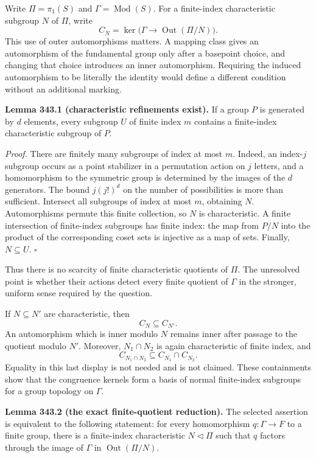 \documentclass[11pt]{article}
\begin{document}
Write $\Pi=\pi_1(S)$ and $\Gamma=\operatorname{Mod}(S)$. For a finite-index characteristic subgroup $N$ of $\Pi$, write
\[
 C_N=\ker\bigl(\Gamma\longrightarrow\operatorname{Out}(\Pi/N)\bigr).
\]
This use of outer automorphisms matters. A mapping class gives an automorphism of the fundamental group only after a basepoint choice, and changing that choice introduces an inner automorphism. Requiring the induced automorphism to be literally the identity would define a different condition without an additional marking.

\textbf{Lemma 343.1 (characteristic refinements exist).} If a group $P$ is generated by $d$ elements, every subgroup $U$ of finite index $m$ contains a finite-index characteristic subgroup of $P$.

\emph{Proof.} There are finitely many subgroups of index at most $m$. Indeed, an index-$j$ subgroup occurs as a point stabilizer in a permutation action on $j$ letters, and a homomorphism to the symmetric group is determined by the images of the $d$ generators. The bound $j(j!)^d$ on the number of possibilities is more than sufficient. Intersect all subgroups of index at most $m$, obtaining $N$. Automorphisms permute this finite collection, so $N$ is characteristic. A finite intersection of finite-index subgroups has finite index: the map from $P/N$ into the product of the corresponding coset sets is injective as a map of sets. Finally, $N\subseteq U$. $\square$

Thus there is no scarcity of finite characteristic quotients of $\Pi$. The unresolved point is whether their actions detect every finite quotient of $\Gamma$ in the stronger, uniform sense required by the question.

If $N\subseteq N'$ are characteristic, then
\[
 C_N\subseteq C_{N'}.
\]
An automorphism which is inner modulo $N$ remains inner after passage to the quotient modulo $N'$. Moreover, $N_1\cap N_2$ is again characteristic of finite index, and
\[
 C_{N_1\cap N_2}\subseteq C_{N_1}\cap C_{N_2}.
\]
Equality in this last display is not needed and is not claimed. These containments show that the congruence kernels form a basis of normal finite-index subgroups for a group topology on $\Gamma$.

\textbf{Lemma 343.2 (the exact finite-quotient reduction).} The selected assertion is equivalent to the following statement: for every homomorphism $q:\Gamma\to F$ to a finite group, there is a finite-index characteristic $N\lhd\Pi$ such that $q$ factors through the image of $\Gamma$ in $\operatorname{Out}(\Pi/N)$.
\end{document}
